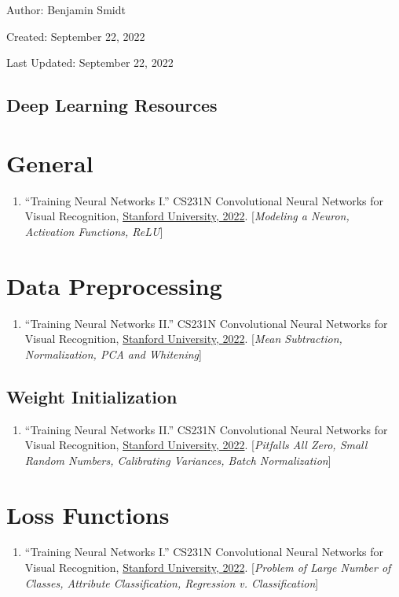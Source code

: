 \documentclass[12pt]{article}
\begin{document}
\noindent Author: Benjamin Smidt

\noindent Created: September 22, 2022

\noindent Last Updated: September 22, 2022
\begin{center}
\section*{Deep Learning Resources}
\end{center}

\tableofcontents{}

\section{General}
\begin{enumerate}
    \item “Training Neural Networks I.” 
    CS231N Convolutional Neural Networks for Visual Recognition, 
    \href{https://cs231n.github.io/neural-networks-1/#intro}{Stanford University, 2022}.
    [\emph{Modeling a Neuron, Activation Functions, ReLU}]
\end{enumerate}

\section{Data Preprocessing}
\begin{enumerate}
    \item “Training Neural Networks II.” 
    CS231N Convolutional Neural Networks for Visual Recognition, 
    \href{https://cs231n.github.io/neural-networks-2/#datapre}{Stanford University, 2022}. 
    [\emph{Mean Subtraction, Normalization, PCA and Whitening}]
\end{enumerate}

\subsection{Weight Initialization}
\begin{enumerate}
    \item “Training Neural Networks II.” 
    CS231N Convolutional Neural Networks for Visual Recognition, 
    \href{https://cs231n.github.io/neural-networks-2/#init}{Stanford University, 2022}. 
    [\emph{Pitfalls All Zero, Small Random Numbers, Calibrating Variances, 
    Batch Normalization}]
\end{enumerate}

\section{Loss Functions}
\begin{enumerate}
    \item “Training Neural Networks I.” 
    CS231N Convolutional Neural Networks for Visual Recognition, 
    \href{https://cs231n.github.io/neural-networks-2/#losses}{Stanford University, 2022}.
    [\emph{Problem of Large Number of Classes, Attribute Classification, 
    Regression v. Classification}]
\end{enumerate}
\end{document}
